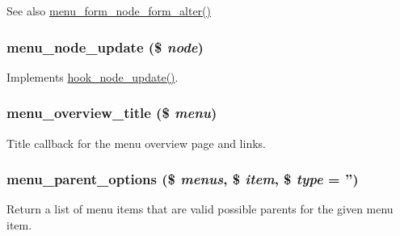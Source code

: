\begin{DoxySeeAlso}{See also}
\hyperlink{menu_8module_aca38a3b6e6e0bc466ef011a0ed9d5cec}{menu\_\-form\_\-node\_\-form\_\-alter()} 
\end{DoxySeeAlso}
\hypertarget{menu_8module_ae4a25e256ee4473d4ed7a5f783b1b42d}{
\subsubsection[{menu\_\-node\_\-update}]{\setlength{\rightskip}{0pt plus 5cm}menu\_\-node\_\-update (\$ {\em node})}}
\label{menu_8module_ae4a25e256ee4473d4ed7a5f783b1b42d}
Implements \hyperlink{group__node__api__hooks_gac66c767cc922fcbfdaf17252e5d87d9d}{hook\_\-node\_\-update()}. \hypertarget{menu_8module_a425d43fa360ea3528b502f1b2a90eaac}{
\subsubsection[{menu\_\-overview\_\-title}]{\setlength{\rightskip}{0pt plus 5cm}menu\_\-overview\_\-title (\$ {\em menu})}}
\label{menu_8module_a425d43fa360ea3528b502f1b2a90eaac}
Title callback for the menu overview page and links. \hypertarget{menu_8module_aa1901dfb8654ccbacd62480ccb8c8f9e}{
\subsubsection[{menu\_\-parent\_\-options}]{\setlength{\rightskip}{0pt plus 5cm}menu\_\-parent\_\-options (\$ {\em menus}, \/  \$ {\em item}, \/  \$ {\em type} = {\ttfamily ''})}}
\label{menu_8module_aa1901dfb8654ccbacd62480ccb8c8f9e}
Return a list of menu items that are valid possible parents for the given menu item.


